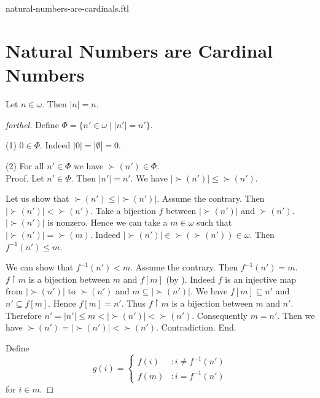\documentclass{naproche-library}
\begin{document}
\begin{smodule}{natural-numbers-are-cardinals.ftl}

  \section*{Natural Numbers are Cardinal Numbers}

  \begin{theorem}[forthel,id=SET_THEORY_07_2948332552978432,printid]
    Let $n \in \omega$.
    Then $|n| = n$.
  \end{theorem}
  \begin{proof}[forthel]
    Define $\Phi = \{ n' \in \omega \mid |n'| = n' \}$.

    (1) $0 \in \Phi$.
    Indeed $|0| = |\emptyset| = 0$.

    (2) For all $n' \in \Phi$ we have $\succ(n') \in \Phi$. \\
    Proof.
      Let $n' \in \Phi$.
      Then $|n'| = n'$.
      We have $|\succ(n')| \leq \succ(n')$.

      Let us show that $\succ(n') \leq |\succ(n')|$.
        Assume the contrary.
        Then $|\succ(n')| < \succ(n')$.
        Take a bijection $f$ between $|\succ(n')|$ and $\succ(n')$.
        $|\succ(n')|$ is nonzero.
        Hence we can take a $m \in \omega$ such that $|\succ(n')| = \succ(m)$.
        Indeed $|\succ(n')| \in \succ(\succ(n')) \in \omega$.
        Then $f^{-1}(n') \leq m$.

        We can show that $f^{-1}(n') < m$.
          Assume the contrary.
          Then $f^{-1}(n') = m$.
          $f \restriction m$ is a bijection between $m$ and $f[m]$ (by ).
          Indeed $f$ is an injective map from $|\succ(n')|$ to $\succ(n')$ and
          $m \subseteq |\succ(n')|$.
          We have $f[m] \subseteq n'$ and $n' \subseteq f[m]$.
          Hence $f[m] = n'$.
          Thus $f \restriction m$ is a bijection between $m$ and $n'$.
          Therefore $n'
            = |n'|
            \leq m
            < |\succ(n')|
            < \succ(n')$.
          Consequently $m = n'$.
          Then we have $\succ(n') = |\succ(n')| < \succ(n')$.
          Contradiction.
        End.

        Define \[ g(i) =
          \begin{cases}
            f(i)  & : i \neq f^{-1}(n')
            \\
            f(m)  & : i = f^{-1}(n')
          \end{cases} \]
        for $i \in m$.


\end{proof}
\end{smodule}
\end{document}
